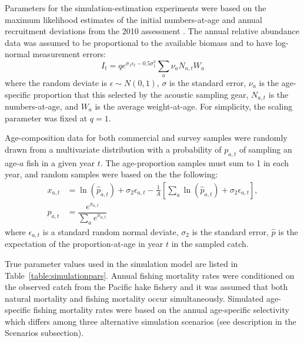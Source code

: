 Parameters for the simulation-estimation experiments were based on the maximum likelihood estimates of the initial numbers-at-age and annual recruitment deviations from the 2010 assessment  \citep{Martell2009}. The annual relative abundance data was assumed to be proportional to the available biomass and to have log-normal measurement errors:
\begin{equation}\label{eq:surveyIndex}
	I_t = q e^{\sigma_1\epsilon_t - 0.5\sigma_1^2} \sum_a \nu_a N_{a,t}  W_a 
\end{equation}
where the random deviate is $\epsilon \sim N(0,1)$, $\sigma$ is the standard error, $\nu_a$ is the age-specific proportion that this selected by the acoustic sampling gear, $N_{a,t}$ is the numbers-at-age, and $W_a$ is the average weight-at-age.  For simplicity, the scaling parameter was fixed at $q=1$.

Age-composition data for both commercial and survey samples were randomly drawn from a multivariate distribution with a probability of $p_{a,t}$ of sampling an age-$a$ fish in a given year $t$.  The age-proportion samples must sum to 1 in each year, and random samples were based on the the following:
\begin{align}
	x_{a,t} &= \ln(\hat{p}_{a,t}) + \sigma_2 \epsilon_{a,t} - \frac{1}{A}
	\left[\sum_a \ln(\hat{p}_{a,t}) + \sigma_2 \epsilon_{a,t} \right],\nonumber \\ 
	p_{a,t} &= \dfrac{e^{x_{a,t}}}{\sum_{a} e^{x_{a,t}} } \label{eq:ageProportion}
\end{align}
where $\epsilon_{a,t}$ is a standard random normal deviate, $\sigma_2$ is the standard error, $\hat{p}$ is the expectation of the proportion-at-age in year $t$ in the sampled catch.

True parameter values used in the simulation model are listed in Table~\ref{table:simulationpars}.  Annual fishing mortality rates were conditioned on the observed catch from the Pacific hake fishery and it was assumed that both natural mortality and fishing mortality occur simultaneously.  Simulated age-specific fishing mortality rates were based on the annual age-specific selectivity which differs among three alternative simulation scenarios (see description in the Scenarios subsection).

